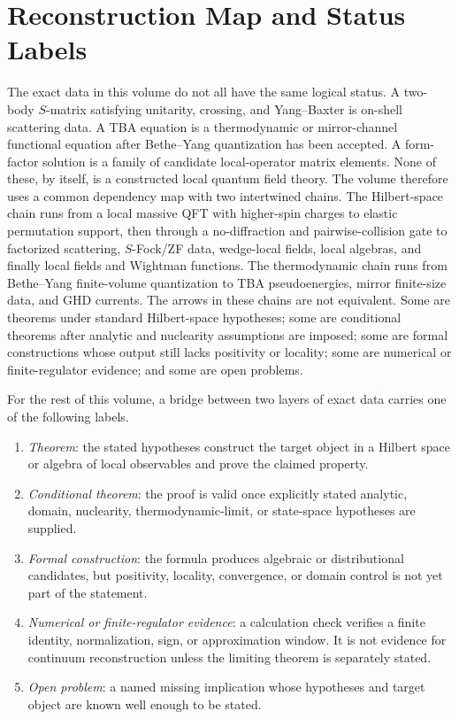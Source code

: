 \section{Reconstruction Map and Status Labels}
\label{sec:integrable-reconstruction-spine}

The exact data in this volume do not all have the same logical status.  A
two-body \(S\)-matrix satisfying unitarity, crossing, and Yang--Baxter is
on-shell scattering data.  A TBA equation is a thermodynamic or mirror-channel
functional equation after Bethe--Yang quantization has been accepted.  A
form-factor solution is a family of candidate local-operator matrix elements.
None of these, by itself, is a constructed local quantum field theory.  The
volume therefore uses a common dependency map with two intertwined chains.
The Hilbert-space chain runs from a local massive QFT with higher-spin charges
to elastic permutation support, then through a no-diffraction and
pairwise-collision gate to factorized scattering, \(S\)-Fock/ZF data,
wedge-local fields, local algebras, and finally local fields and Wightman
functions.  The thermodynamic chain runs from Bethe--Yang finite-volume
quantization to TBA pseudoenergies, mirror finite-size data, and GHD currents.
The arrows in these chains are not equivalent.  Some are theorems under
standard Hilbert-space hypotheses; some are conditional theorems after
analytic and nuclearity assumptions are imposed; some are formal constructions
whose output still lacks positivity or locality; some are numerical or
finite-regulator evidence; and some are open problems.

\begin{definition}
\label{def:integrable-reconstruction-status-labels}
For the rest of this volume, a bridge between two layers of exact data carries
one of the following labels.
\begin{enumerate}[label=\textnormal{(\roman*)}]
\item \emph{Theorem}: the stated hypotheses construct the target object in a
  Hilbert space or algebra of local observables and prove the claimed property.
\item \emph{Conditional theorem}: the proof is valid once explicitly stated
  analytic, domain, nuclearity, thermodynamic-limit, or state-space hypotheses
  are supplied.
\item \emph{Formal construction}: the formula produces algebraic or
  distributional candidates, but positivity, locality, convergence, or domain
  control is not yet part of the statement.
\item \emph{Numerical or finite-regulator evidence}: a calculation check
  verifies a finite identity, normalization, sign, or approximation window.  It
  is not evidence for continuum reconstruction unless the limiting theorem is
  separately stated.
\item \emph{Open problem}: a named missing implication whose hypotheses and
  target object are known well enough to be stated.
\end{enumerate}
\end{definition}


